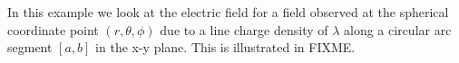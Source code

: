 %
%
In this example we look at the electric field for a field observed at the spherical coordinate point \( (r, \theta, \phi) \) due to a line charge density of \( \lambda \) along a circular arc segment \( [a,b] \) in the x-y plane.
This is illustrated in FIXME.



